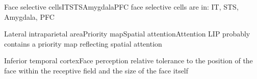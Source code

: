 \begin{kite}{Face selective cells}{IT}{STS}{Amygdala}{PFC}
  face selective cells are in: IT, STS, Amygdala, PFC
\end{kite}


\begin{kite}{Lateral intraparietal area}{Priority map}{Spatial attention}{Attention}{}
  LIP probably contains a priority map reflecting spatial attention
\end{kite}


\begin{kite}{Inferior temporal cortex}{Face perception}{}{}{}
  relative tolerance to the position of the face within the receptive
  field and the size of the face itself
\end{kite}
